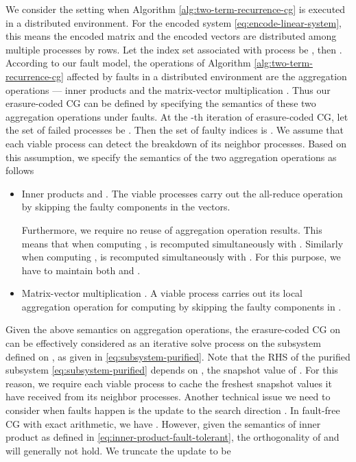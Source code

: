 \documentclass[11pt]{article}
\begin{document}
We consider the setting when Algorithm \ref{alg:two-term-recurrence-cg} is executed
in a distributed environment. For the encoded system \eqref{eq:encode-linear-system},
this means the encoded matrix  and the encoded vectors are distributed among
multiple processes by rows. Let the index set associated with process  be ,
then . According to our fault model, the operations of
Algorithm \ref{alg:two-term-recurrence-cg} affected by faults in a distributed
environment are the aggregation operations --- inner products and the matrix-vector
multiplication . Thus our erasure-coded CG can be defined by specifying
the semantics of these two aggregation operations under faults. At the -th
iteration of erasure-coded CG, let the set of failed processes be .
Then the set of faulty indices is . We assume that 
each viable process can detect the breakdown of its neighbor processes. 
Based on this assumption, we specify the semantics of the two aggregation operations as follows
\begin{itemize}
\item Inner products  and . The viable processes carry out the all-reduce operation by skipping the faulty components  in the vectors.

Furthermore, we require no reuse of aggregation operation results. This means that
when computing ,  is recomputed simultaneously
with . Similarly when computing , 
is recomputed simultaneously with . For this purpose, we have to
maintain both  and .
\item Matrix-vector multiplication . A viable process carries out its local aggregation operation for computing   by skipping the faulty components  in .

\end{itemize}
Given the above semantics on aggregation operations, the erasure-coded CG on
 can be effectively considered as an iterative solve process on the subsystem
defined on , as given in \eqref{eq:subsystem-purified}.
Note that the RHS of the purified subsystem \eqref{eq:subsystem-purified} depends on
, the snapshot value of . For this reason, we require each viable
process to cache the freshest snapshot values it have received from its neighbor
processes. Another technical issue we need to consider when faults happen is the
update to the search direction . In fault-free CG with exact arithmetic,
we have . However, given the semantics of inner product
as defined in \eqref{eq:inner-product-fault-tolerant}, the orthogonality of
 and  will generally not hold. We truncate the
update  to be
\end{document}

